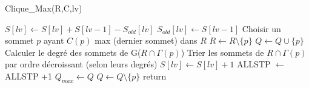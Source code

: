 \documentclass{article}
\begin{document}
\begin{algorithm}
\caption{Clique\_Max(R,C,lv)}
\begin{algorithmic}
  \State $S[lv] \gets S[lv] + S[lv-1] -S_{old}[lv]$
  \State $S_{old}[lv]\gets S[lv-1]$
    \State Choisir un sommet $p$ ayant $C(p)$ max (dernier sommet) dans $R$
    \State $R \gets R \setminus \{p\}$
      \State $Q \gets Q \cup \{p\}$
          \State Calculer le degré des sommets de G($R \cap \Gamma(p)$)
          \State Trier les sommets de $R \cap \Gamma(p)$ par ordre décroissant
          \State (selon leurs degrés)
        \EndIf
        \State {}
        \State $S[lv] \gets S[lv]+1$
        \State ALLSTP $\gets$ ALLSTP +1
        \State  {}
        $Q_{max} \gets Q$
      \EndIf
      \State $Q \gets Q\setminus \{p\}$
    \Else
      \State return
    \EndIf
  \EndWhile
\EndProcedure
\end{algorithmic}
\end{algorithm}
\end{document}
